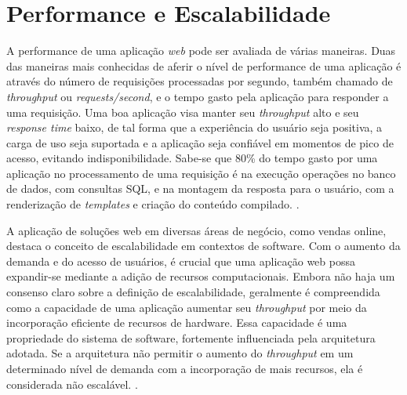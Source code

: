 \section{Performance e Escalabilidade}

A performance de uma aplicação \textit{web} pode ser avaliada de várias maneiras. Duas das maneiras mais conhecidas de aferir o nível de performance de uma aplicação é através do número de requisições processadas por segundo, também chamado de \textit{throughput} ou \textit{requests/second}, e o tempo gasto pela aplicação para responder a uma requisição. Uma boa aplicação visa manter seu \textit{throughput} alto e seu \textit{response time} baixo, de tal forma que a experiência do usuário seja positiva, a carga de uso seja suportada e a aplicação seja confiável em momentos de pico de acesso, evitando indisponibilidade. Sabe-se que 80\% do tempo gasto por uma aplicação no processamento de uma requisição é na execução operações no banco de dados, com consultas SQL, e na montagem da resposta para o usuário, com a renderização de \textit{templates} e criação do conteúdo compilado. \cite{jugo2014analysis}.

A aplicação de soluções web em diversas áreas de negócio, como vendas online, destaca o conceito de escalabilidade em contextos de software. Com o aumento da demanda e do acesso de usuários, é crucial que uma aplicação web possa expandir-se mediante a adição de recursos computacionais. Embora não haja um consenso claro sobre a definição de escalabilidade, geralmente é compreendida como a capacidade de uma aplicação aumentar seu \textit{throughput} por meio da incorporação eficiente de recursos de hardware. Essa capacidade é uma propriedade do sistema de software, fortemente influenciada pela arquitetura adotada. Se a arquitetura não permitir o aumento do \textit{throughput} em um determinado nível de demanda com a incorporação de mais recursos, ela é considerada não escalável. \cite{williams2004web}.